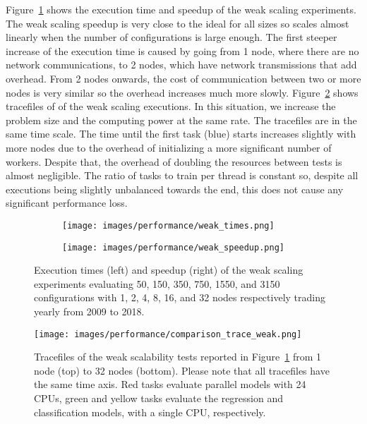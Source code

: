 Figure~\ref{fig:weak} shows the execution time and speedup of the weak scaling experiments. The weak scaling speedup is very close to the ideal for all sizes so \HPCsys scales almost linearly when the number of configurations is large enough. The first steeper increase of the execution time is caused by going from 1 node, where there are no network communications, to 2 nodes, which have network transmissions that add overhead. From 2 nodes onwards, the cost of communication between two or more nodes is very similar so the overhead increases much more slowly. Figure~\ref{fig:traces_weak} shows tracefiles of of the weak scaling executions. In this situation, we increase the problem size and the computing power at the same rate. The tracefiles are in the same time scale. The time until the first task (blue) starts increases slightly with more nodes due to the overhead of initializing a more significant number of workers. Despite that, the overhead of doubling the resources between tests is almost negligible. The ratio of tasks to train per thread is constant so, despite all executions being slightly unbalanced towards the end, this does not cause any significant performance loss.


\begin{figure}
\centering
\begin{subfigure}{.5\textwidth}
  \centering
  \texttt{[image: images/performance/weak\_times.png]}
\end{subfigure}%
\begin{subfigure}{.5\textwidth}
  \centering
  \texttt{[image: images/performance/weak\_speedup.png]}
\end{subfigure}
\caption{Execution times (left) and speedup (right) of the weak scaling experiments evaluating 50, 150, 350, 750, 1550, and 3150 configurations with 1, 2, 4, 8, 16, and 32 nodes respectively trading yearly from 2009 to 2018.}
\label{fig:weak}
\end{figure}


\begin{figure}
    \centering
    \texttt{[image: images/performance/comparison\_trace\_weak.png]}
    \caption{\small Tracefiles of the weak scalability tests reported in Figure~\ref{fig:weak} from 1 node (top) to 32 nodes (bottom). Please note that all tracefiles have the same time axis. Red tasks evaluate parallel models with 24 CPUs, green and yellow tasks evaluate the regression and classification models, with a single CPU, respectively.}
    \label{fig:traces_weak}
\end{figure}

